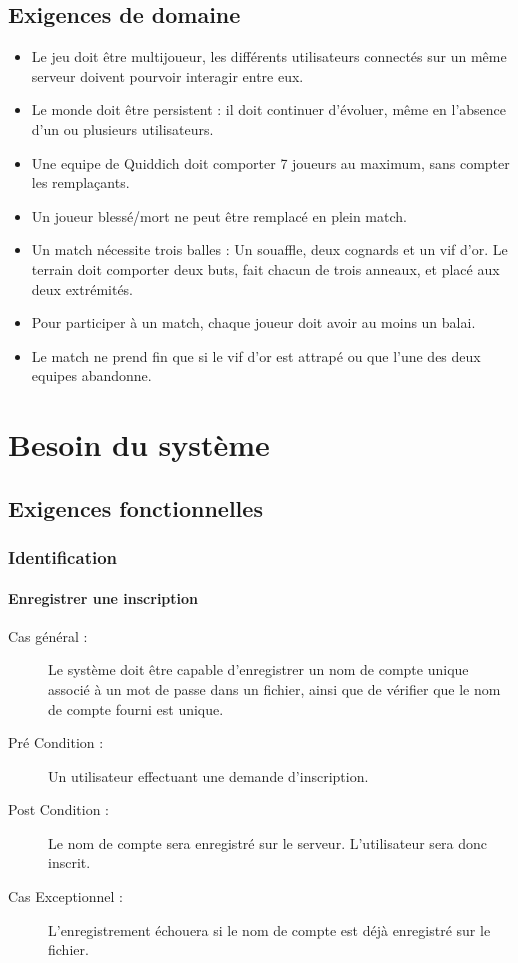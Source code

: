 \documentclass[a4paper]{article}
\begin{document}

\subsection{Exigences de domaine}
\begin{itemize}
    \item Le jeu doit être multijoueur, les différents \glspl{utilisateur} connectés sur un même \gls{serveur} doivent pourvoir interagir entre eux.
    \item Le monde doit être persistent : il doit continuer d'évoluer, même en l'absence d'un ou plusieurs \glspl{utilisateur}.
    \item Une \gls{equipe} de Quiddich doit comporter 7 \glspl{joueur} au maximum, sans compter les remplaçants.
    \item Un \gls{joueur} blessé/mort ne peut être remplacé en plein match.
    \item Un match nécessite trois balles : Un souaffle, deux cognards et un vif d'or. Le terrain doit comporter deux buts, fait chacun de trois anneaux, et placé aux deux extrémités.
    \item Pour participer à un match, chaque \gls{joueur} doit avoir au moins un balai.
    \item Le match ne prend fin que si le vif d'or est attrapé ou que l'une des deux \glspl{equipe} abandonne.
    
\end{itemize}


\section{Besoin du système}
\subsection{Exigences fonctionnelles}

\subsubsection{Identification}
\paragraph{Enregistrer une inscription}
\begin{description}
\item[Cas général :] Le système doit être capable d'enregistrer un nom de compte unique associé à un mot de passe dans un fichier, ainsi que de vérifier que le nom de compte fourni est unique.
\item[Pré Condition  :] Un \gls{utilisateur} effectuant une demande d'inscription.
\item[Post Condition :] Le nom de compte sera enregistré sur le \gls{serveur}. L'\gls{utilisateur} sera donc inscrit.
\item[Cas Exceptionnel :] L'enregistrement échouera si le nom de compte est déjà enregistré sur le fichier.
\end{description}
\end{document}
